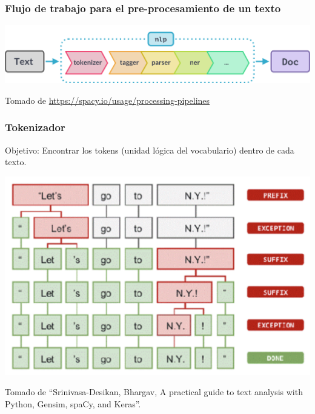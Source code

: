 \documentclass[
10pt, %
aspectratio=169, %
]{beamer}
\begin{document}
	\begin{frame}
		
		\frametitle{Flujo de trabajo para el pre-procesamiento de un texto}
		
		
		\centering
		\includegraphics[scale=0.35]{pipeline.png} 
		
		\vspace{3\baselineskip}
		{\scriptsize Tomado de \url{https://spacy.io/usage/processing-pipelines}}
		
	\end{frame}
	
	
	\begin{frame}
		
		\frametitle{Tokenizador}
		
		\begin{alertblock}{} 
			Objetivo: Encontrar los tokens (unidad lógica del vocabulario) dentro de cada texto. 
		\end{alertblock}
		
		\centering
		\includegraphics[scale=0.23]{tokenizador.png} 
		
		{\scriptsize Tomado de ``Srinivasa-Desikan, Bhargav, A practical guide to text analysis with Python, Gensim, spaCy, and Keras''.}
		
	\end{frame}
	
\end{document}
